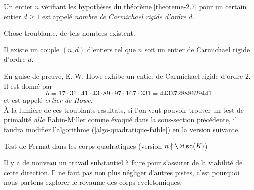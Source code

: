 \begin{definition}
	Un entier $n$ vérifiant les hypothèses du théorème \ref{theoreme-2.7} pour un certain entier $d\geq 1$ est appelé \emph{nombre de Carmichael rigide d'ordre $d$}.
\end{definition}

Chose troublante, de tels nombres existent.

\begin{theoreme}[Howe, 2000]
	Il existe un couple $(n, d)$ d'entiers tel que $n$ soit un entier de Carmichael rigide d'ordre $d$.
\end{theoreme}

En guise de preuve, E. W. Howe exhibe un entier de Carmichael rigide d'ordre $2$. Il est donné par 
	\begin{equation}\label{Howe}
		h = 17 \cdot 31 \cdot 41 \cdot 43 \cdot 89 \cdot 97 \cdot 167 \cdot 331 = 443372888629441
	\end{equation}
et est appelé \emph{entier de Howe}. \\

À la lumière de ces troublants résultats, si l'on veut pouvoir trouver un test de primalité \emph{alla} Rabin-Miller comme évoqué dans la sous-section précédente, il faudra modifier l'algorithme (\ref{algo-quadratique-faible}) en la version suivante.


\vspace{1em}
\begin{algorithm}[H]\label{algo-quadratique-faible}
\caption{Test de Fermat dans les corps quadratiques (version $n\nmid \Disc(K)$)}
\end{algorithm}
\vspace{1em}

Il y a de nouveau un travail substantiel à faire pour s'assurer de la viabilité de cette direction. Il ne faut pas non plus négliger d'autres pistes, c'est pourquoi nous partons explorer le royaume des corps cyclotomiques.
